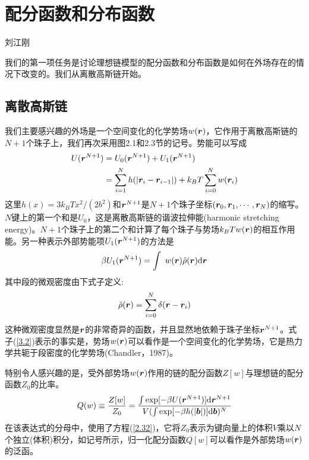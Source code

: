 \section{配分函数和分布函数}
\begin{center}
刘江刚
\end{center}
我们的第一项任务是讨论理想链模型的配分函数和分布函数是如何在外场存在的情况下改变的。我们从离散高斯链开始。
\subsection{离散高斯链}
我们主要感兴趣的外场是一个空间变化的化学势场$w(\bm{r})$，它作用于离散高斯链的$N+1$个珠子上，我们再次采用图2.1和2.3节的记号。势能可以写成
\begin{equation}\label{3.1}
\begin{aligned}
U(\bm{r}^{N+1})&=U_0(\bm{r}^{N+1})+U_1(\bm{r}^{N+1})\\
&=\sum\limits_{i=1}^Nh(\left|\bm{r}_i-\bm{r}_{i-1}\right|)+k_BT\sum\limits_{i=0}^Nw(\bm{r}_i)
\end{aligned}
\end{equation}
这里$h(x)=3k_BTx^2/(2b^2)$和$\bm{r}^{N+1}$是$N+1$个珠子坐标$(\bm{r}_0,\bm{r}_1,\cdots,\bm{r}_N)$的缩写。$N$键上的第一个和是$U_0$，这是离散高斯链的谐波拉伸能(harmonic stretching energy)。$N+1$个珠子上的第二个和计算了每个珠子与势场$k_BTw(\bm{r})$的相互作用能。另一种表示外部势能项$U_1(\bm{r}^{N+1})$的方法是
\begin{equation}\label{3.2}
\beta U_1(\bm{r}^{N+1})=\int~w(\bm{r})\hat{\rho}(\bm{r})\mathrm{d}\bm{r}
\end{equation}
其中段的微观密度由下式子定义:
\begin{equation}\label{3.3}
\hat{\rho}(\bm{r})=\sum\limits_{i=0}^N\delta(\bm{r}-\bm{r}_i)
\end{equation}
这种微观密度显然是$\bm{r}$的非常奇异的函数，并且显然地依赖于珠子坐标$\bm{r}^{N+1}$。式子(\ref{3.2})表示的事实是，势场$w(\bm{r})$可以看作是一个空间变化的化学势场，它是热力学共轭于段密度的化学势场(Chandler，1987)。

特别令人感兴趣的是，受外部势场$w(\bm{r})$作用的链的配分函数$Z[w]$与理想链的配分函数$Z_0$的比率。
\begin{equation}\label{3.4}
Q(w)\equiv\frac{Z[w]}{Z_0}=\frac{\int\exp[-\beta U(\bm{r}^{N+1})]\mathrm{d}\bm{r}^{N+1}}{V(\int\exp[-\beta h(\left|\bm{b}\right|)]\mathrm{d}\bm{b})^N}
\end{equation}
在该表达式的分母中，使用了方程(\ref{2.32})，它将$Z_0$表示为键向量上的体积$V$乘以$N$个独立(体积)积分，如记号所示，归一化配分函数$Q[w]$可以看作是外部势场$w(\bm{r})$的泛函。

